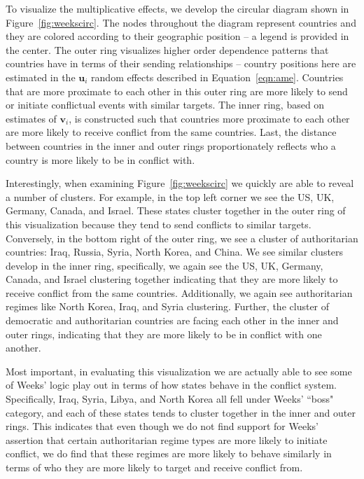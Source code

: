 To visualize the multiplicative effects, we develop the circular diagram shown in Figure~\ref{fig:weekscirc}. The nodes throughout the diagram represent countries and they are colored according to their geographic position -- a legend is provided in the center. The outer ring visualizes higher order dependence patterns that countries have in terms of their sending relationships -- country positions here are estimated in the $\mathbf{u}_{i}$ random effects described in Equation~\ref{eqn:ame}. Countries that are more proximate to each other in this outer ring are more likely to send or initiate conflictual events with similar targets. The inner ring, based on estimates of $\mathbf{v}_{i}$, is constructed such that countries more proximate to each other are more likely to receive conflict from the same countries. Last, the distance between countries in the inner and outer rings proportionately reflects who a country is more likely to be in conflict with. 

Interestingly, when examining Figure~\ref{fig:weekscirc} we quickly are able to reveal a number of clusters. For example, in the top left corner we see the US, UK, Germany, Canada, and Israel. These states cluster together in the outer ring of this visualization because they tend to send conflicts to similar targets. Conversely, in the bottom right of the outer ring, we see a cluster of authoritarian countries: Iraq, Russia, Syria, North Korea, and China. We see similar clusters develop in the inner ring, specifically, we again see the US, UK, Germany, Canada, and Israel clustering together indicating that they are more likely to receive conflict from the same countries. Additionally, we again see authoritarian regimes like North Korea, Iraq, and Syria clustering. Further, the cluster of democratic and authoritarian countries are facing each other in the inner and outer rings, indicating that they are more likely to be in conflict with one another. 

Most important, in evaluating this visualization we are actually able to see some of Weeks' logic play out in terms of how states behave in the conflict system. Specifically, Iraq, Syria, Libya, and North Korea all fell under Weeks' ``boss" category, and each of these states tends to cluster together in the inner and outer rings. This indicates that even though we do not find support for Weeks' assertion that certain authoritarian regime types are more likely to initiate conflict, we do find that these regimes are more likely to behave similarly in terms of who they are more likely to target and receive conflict from. 

